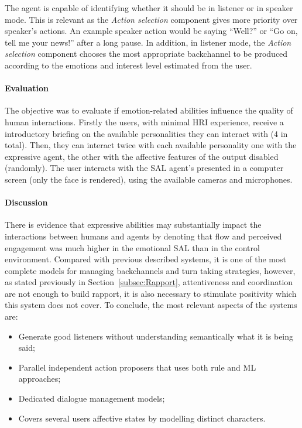 The agent is capable of identifying whether it should be in listener or in speaker mode. This is relevant as the \textit{Action selection} component gives more priority over speaker's actions. An example speaker action would be  saying ``Well?'' or ``Go on, tell me your news!'' after a long pause. In addition, in listener mode, the \textit{Action selection} component chooses the most appropriate backchannel to be produced according to the emotions and interest level estimated from the user.

\paragraph{\textbf{Evaluation}}

The objective was to evaluate if emotion-related abilities influence the quality of human interactions. Firstly the users, with minimal \ac{HRI} experience, receive a introductory briefing on the available personalities they can interact with (4 in total). Then, they can interact twice with each available personality one with the expressive agent, the other with the affective features of the output disabled (randomly). The user interacts with the \ac{SAL} agent's presented in a computer screen (only the face is rendered), using the available cameras and microphones.

\paragraph{\textbf{Discussion}}
There is evidence that expressive abilities may substantially impact the interactions between humans and agents by denoting that flow and perceived engagement was much higher in the emotional \ac{SAL} than in the control environment. Compared with previous described systems, it is one of the most complete models for managing backchannels and turn taking strategies, however, as stated previously in Section~\ref{subsec:Rapport}, attentiveness and coordination are not enough to build rapport, it is also necessary to stimulate positivity which this system does not cover. To conclude, the most relevant aspects of the systems are:

\begin{itemize}
	\item Generate good listeners without understanding semantically what it is being said;
	\item Parallel independent action proposers that uses both rule and \ac{ML} approaches;
	\item Dedicated dialogue management models;
	\item Covers several users affective states by modelling distinct characters.
\end{itemize}